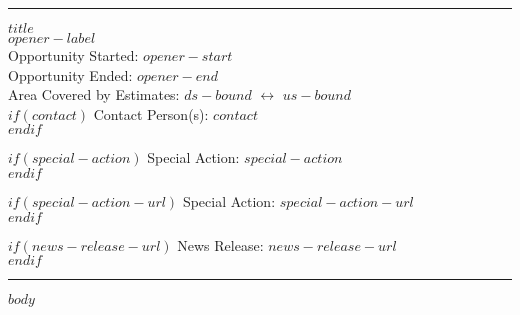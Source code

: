 \documentclass[letterpaper,11pt,$for(classoption)$$classoption$$sep$,$endfor$]{article}
\begin{document}
\rule{\textwidth}{1pt}
\begin{flushleft}

{\bf\LARGE{$title$}}\\
{\Large{$opener-label$}}\\

{\small{Opportunity Started: $opener-start$}}\\

{\small{Opportunity Ended: $opener-end$}}\\

{\small{Area Covered by Estimates: $ds-bound$ \( \longleftrightarrow \) $us-bound$}}\\

$if(contact)$
{\small{Contact Person(s): $contact$}}\\
$endif$

$if(special-action)$
{\small{Special Action: $special-action$}}\\
$endif$

$if(special-action-url)$
{\small{Special Action: $special-action-url$}}\\
$endif$

$if(news-release-url)$
{\small{News Release: $news-release-url$}}\\
$endif$
\end{flushleft}
\vspace{-10pt}
\rule{\textwidth}{1pt}

$body$

\end{document}
